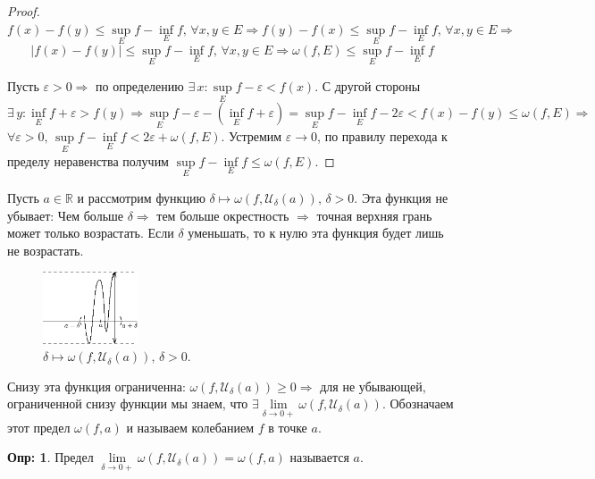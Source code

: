 \documentclass[12pt]{article}
\theoremstyle{definition}
\newtheorem{defn}{Опр:}
\begin{document}
\begin{proof}
	$f(x) - f(y) \leq \sup\limits_{E}{f} - \inf\limits_{E}{f}, \, \forall x,y \in E \Rightarrow f(y) - f(x) \leq \sup\limits_{E}{f} - \inf\limits_{E}{f}, \, \forall x,y \in E \Rightarrow$ 
	$$|f(x) - f(y)| \leq \sup\limits_{E}{f} - \inf\limits_{E}{f}, \, \forall x,y \in E \Rightarrow \omega(f,E) \leq \sup\limits_{E}{f} - \inf\limits_{E}{f}$$
	
	Пусть $\varepsilon > 0 \Rightarrow$ по определению $\exists \, x \colon \sup\limits_{E}{f} - \varepsilon < f(x)$. С другой стороны $\exists \, y \colon \inf\limits_{E}{f} + \varepsilon > f(y) \Rightarrow \sup\limits_{E}{f} - \varepsilon - (\inf\limits_{E}{f} + \varepsilon) = \sup\limits_{E}{f} - \inf\limits_{E}{f} - 2\varepsilon < f(x) - f(y) \leq \omega(f,E) \Rightarrow$
	$\forall \varepsilon >0, \, \sup\limits_{E}{f} - \inf\limits_{E}{f} < 2\varepsilon +   \omega(f,E)$. Устремим $\varepsilon \to 0$, по правилу перехода к пределу неравенства получим $\sup\limits_{E}{f} - \inf\limits_{E}{f} \leq \omega(f,E)$.
\end{proof}

Пусть $a \in \mathbb{R}$  и рассмотрим функцию $\delta \mapsto \omega(f,\mathcal{U}_\delta(a)), \, \delta >0$. Эта функция не убывает: Чем больше $\delta \Rightarrow$ тем больше окрестность $\Rightarrow$ точная верхняя грань может только возрастать. Если $\delta$ уменьшать, то к нулю эта функция будет лишь не возрастать.

\begin{figure}[H]
	\centering
	\includegraphics[width=0.25\textwidth]{17_9.eps}
	\caption{$\delta \mapsto \omega(f,\mathcal{U}_\delta(a)), \, \delta >0$.}
	\label{17_9}
\end{figure}

Снизу эта функция ограниченна: $\omega(f,\mathcal{U}_\delta(a)) \geq 0 \Rightarrow$ для не убывающей, ограниченной снизу функции мы знаем, что $\exists \! \lim\limits_{\delta \to 0+} \omega(f,\mathcal{U}_\delta(a))$. Обозначаем этот предел $\omega(f,a)$ и называем колебанием $f$ в точке $a$.
\begin{defn}
	Предел $\lim\limits_{\delta \to 0+} \omega(f,\mathcal{U}_\delta(a)) = \omega(f,a)$ называется  $a$.
\end{defn}
\end{document}
